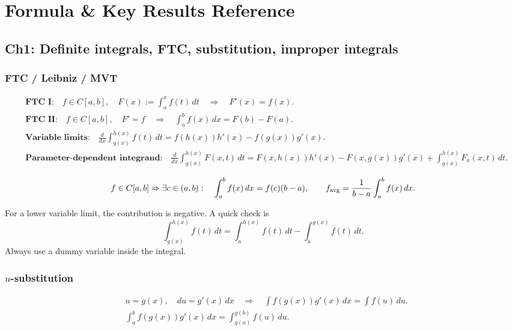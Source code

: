 \section{Formula \& Key Results Reference}

\subsection{Ch1: Definite integrals, FTC, substitution, improper integrals}

\subsubsection{FTC / Leibniz / MVT}
\begin{keyformula}[title={Fundamental Theorem of Calculus and Leibniz Rules}]
\begin{align*}
&\textbf{FTC I:}\quad f\in C[a,b],\quad F(x):=\int_a^x f(t)\,dt
\quad\Rightarrow\quad F'(x)=f(x).\\
&\textbf{FTC II:}\quad f\in C[a,b],\quad F'=f
\quad\Rightarrow\quad \int_a^b f(x)\,dx=F(b)-F(a).\\
&\textbf{Variable limits:}\quad
\frac{d}{dx}\int_{g(x)}^{h(x)} f(t)\,dt
=f(h(x))h'(x)-f(g(x))g'(x).\\
&\textbf{Parameter-dependent integrand:}\quad
\frac{d}{dx}\int_{g(x)}^{h(x)} F(x,t)\,dt
=F(x,h(x))h'(x)-F(x,g(x))g'(x)+\int_{g(x)}^{h(x)}F_x(x,t)\,dt.
\end{align*}
\end{keyformula}

\begin{keyformula}[title={Mean Value Theorem for Integrals and Average Value}]
\[
f\in C[a,b]\Rightarrow \exists c\in(a,b):\quad
\int_a^b f(x)\,dx=f(c)(b-a),
\qquad
f_{\rm avg}=\frac{1}{b-a}\int_a^b f(x)\,dx.
\]
\end{keyformula}

\begin{examtip}
For a lower variable limit, the contribution is negative.  A quick check is
\[
\int_{g(x)}^{h(x)}f(t)\,dt=\int_a^{h(x)}f(t)\,dt-\int_a^{g(x)}f(t)\,dt.
\]
Always use a dummy variable inside the integral.
\end{examtip}

\subsubsection{$u$-substitution}
\begin{keyformula}[title={Substitution, Indefinite and Definite Forms}]
\begin{align*}
&u=g(x),\quad du=g'(x)\,dx
\quad\Rightarrow\quad
\int f(g(x))g'(x)\,dx=\int f(u)\,du.\\
&\int_a^b f(g(x))g'(x)\,dx=\int_{g(a)}^{g(b)} f(u)\,du.
\end{align*}
\end{keyformula}

